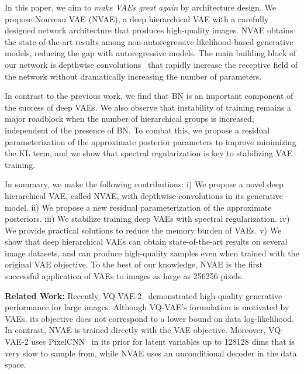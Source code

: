 \documentclass{article}
\begin{document}
In this paper, we aim to \textit{make VAEs great again} by architecture design. We propose Nouveau VAE (NVAE), a deep hierarchical VAE with a carefully designed network architecture that produces high-quality images. NVAE obtains the state-of-the-art results among non-autoregressive likelihood-based generative models, reducing the gap with autoregressive models. The main building block of our network is depthwise convolutions~\cite{vanhoucke2014depth, chollet2017xception} that rapidly increase the receptive field of the network without dramatically increasing the number of parameters. 

In contrast to the previous work, we find that BN is an important component of the success of deep VAEs. We also observe that instability of training remains a major roadblock when the number of hierarchical groups is increased, independent of the presence of BN. To combat this, we propose a residual parameterization of the approximate posterior parameters to improve minimizing the KL term, and we show that spectral regularization is key to stabilizing VAE training. 


In summary, we make the following contributions: i) We propose a novel deep hierarchical VAE, called NVAE, with depthwise convolutions in its generative model. ii) We propose a new residual parameterization of the approximate posteriors. iii) We stabilize training deep VAEs with spectral regularization. iv) We provide practical solutions to reduce the memory burden of VAEs. v) We show that deep hierarchical VAEs can obtain state-of-the-art results on several image datasets, and can produce high-quality samples even when trained with the original VAE objective. To the best of our knowledge, NVAE is the first successful application of VAEs to images as large as 256256 pixels.

\textbf{Related Work:} Recently, VQ-VAE-2~\cite{razavi2019generating} demonstrated high-quality generative performance for large images. Although VQ-VAE's formulation is motivated by VAEs, its objective does not correspond to a lower bound on data log-likelihood. In contrast, NVAE is trained directly with the VAE objective. Moreover, VQ-VAE-2 uses PixelCNN~\cite{van2016pixel} in its prior for latent variables up to 128128 dims that is very slow to sample from, while NVAE uses an unconditional decoder in the data space. 
\end{document}

